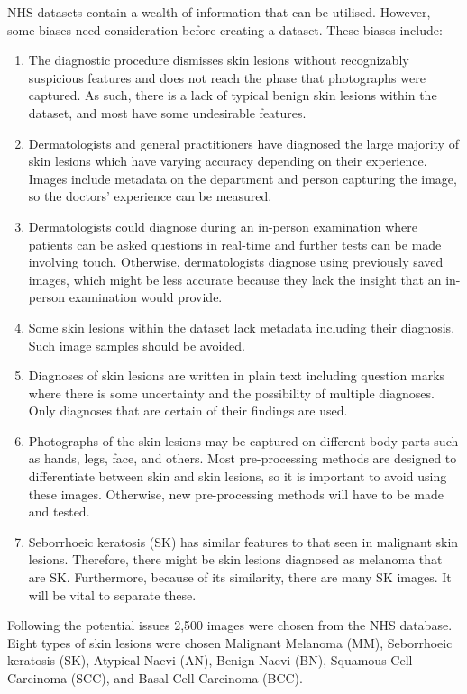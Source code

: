 NHS datasets contain a wealth of information that can be utilised. However, some biases need consideration before creating a dataset. These biases include:

\begin{enumerate}
    \item The diagnostic procedure dismisses skin lesions without recognizably suspicious features and does not reach the phase that photographs were captured. As such, there is a lack of typical benign skin lesions within the dataset, and most have some undesirable features.
    \item Dermatologists and general practitioners have diagnosed the large majority of skin lesions which have varying accuracy depending on their experience. Images include metadata on the department and person capturing the image, so the doctors' experience can be measured.
    \item Dermatologists could diagnose during an in-person examination where patients can be asked questions in real-time and further tests can be made involving touch. Otherwise, dermatologists diagnose using previously saved images, which might be less accurate because they lack the insight that an in-person examination would provide.
    \item Some skin lesions within the dataset lack metadata including their diagnosis. Such image samples should be avoided.
    \item Diagnoses of skin lesions are written in plain text including question marks where there is some uncertainty and the possibility of multiple diagnoses. Only diagnoses that are certain of their findings are used.
    \item Photographs of the skin lesions may be captured on different body parts such as hands, legs, face, and others. Most pre-processing methods are designed to differentiate between skin and skin lesions, so it is important to avoid using these images. Otherwise, new pre-processing methods will have to be made and tested.
    \item Seborrhoeic keratosis (SK) has similar features to that seen in malignant skin lesions. Therefore, there might be skin lesions diagnosed as melanoma that are SK. Furthermore, because of its similarity, there are many SK images. It will be vital to separate these.
\end{enumerate}

Following the potential issues 2,500 images were chosen from the NHS database. Eight types of skin lesions were chosen Malignant Melanoma (MM), Seborrhoeic keratosis (SK), Atypical Naevi (AN), Benign Naevi (BN), Squamous Cell Carcinoma (SCC), and Basal Cell Carcinoma (BCC).

